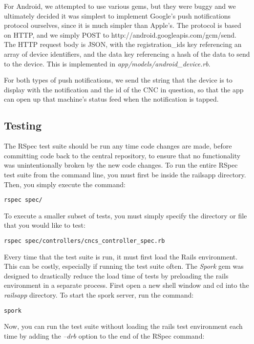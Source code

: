 \documentclass[12pt,letterpaper,titlepage]{article}
\begin{document}
For Android, we attempted to use various gems, but they were buggy and we ultimately decided it was simplest to implement Google's push notifications protocol ourselves, since it is much simpler than Apple's. The protocol is based on HTTP, and we simply POST to http://android.googleapis.com/gcm/send. The HTTP request body is JSON, with the registration\_ids key referencing an array of device identifiers, and the data key referencing a hash of the data to send to the device. This is implemented in \textit{app/models/android\_device.rb}.

For both types of push notifications, we send the string that the device is to display with the notification and the id of the CNC in question, so that the app can open up that machine’s status feed when the notification is tapped.

\subsection{Testing} \label{doc:Testing}

The RSpec test suite should be run any time code changes are made, before committing code back to the central repository, to ensure that no functionality was unintentionally broken by the new code changes. To run the entire RSpec test suite from the command line, you must first be inside the railsapp directory. Then, you simply execute the command:

\begin{lstlisting}
rspec spec/
\end{lstlisting}
To execute a smaller subset of tests, you must simply specify the directory or file that you would like to test:

\begin{lstlisting}
rspec spec/controllers/cncs_controller_spec.rb
\end{lstlisting}
Every time that the test suite is run, it must first load the Rails environment. This can be costly, especially if running the test suite often. The \textit{Spork} gem was designed to drastically reduce the load time of tests by preloading the rails environment in a separate process. First open a new shell window and cd into the \textit{railsapp} directory. To start the spork server, run the command:

\begin{lstlisting}
spork
\end{lstlisting}
Now, you can run the test suite without loading the rails test environment each time by adding the \textit{--drb} option to the end of the RSpec command:
\end{document}
